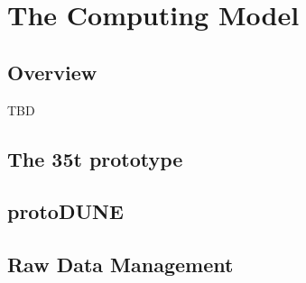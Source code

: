 \section{The Computing Model}
\label{sec:computing_model}
\subsection{Overview}
TBD
\subsection{The 35t prototype}

\newpage
\subsection{protoDUNE}




\subsection{Raw Data Management}
